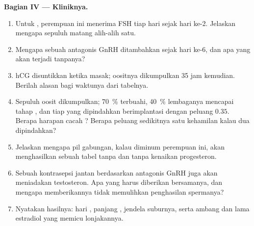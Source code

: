 \begin{problem}
\medskip
\noindent\textbf{Bagian IV --- Kliniknya.}
\begin{enumerate}[resume]
  \item Untuk , perempuan ini menerima FSH tiap
        hari sejak hari ke-2. Jelaskan mengapa sepuluh  matang
        alih-alih satu.
  \item Mengapa sebuah antagonis GnRH ditambahkan sejak hari ke-6, dan
        apa yang akan terjadi tanpanya?
  \item hCG disuntikkan ketika  masak; oositnya dikumpulkan
        35 jam kemudian. Berilah alasan bagi waktunya dari tabelnya.
  \item Sepuluh oosit dikumpulkan; \qty{70}{\%} terbuahi,
        \qty{40}{\%} lembaganya mencapai tahap , dan tiap
         yang dipindahkan berimplantasi dengan peluang
        $0.35$. Berapa harapan cacah ? Berapa peluang
        sedikitnya satu kehamilan kalau dua dipindahkan?
  \item Jelaskan mengapa pil gabungan, kalau diminum perempuan ini,
        akan menghasilkan sebuah tabel tanpa  dan tanpa
        kenaikan progesteron.
  \item Sebuah kontrasepsi jantan berdasarkan antagonis GnRH juga akan
        meniadakan testosteron. Apa yang harus diberikan bersamanya,
        dan mengapa memberikannya tidak memulihkan penghasilan
        spermanya?
  \item Nyatakan hasilnya: hari , panjang ,
        jendela suburnya, serta ambang dan lama estradiol yang memicu
        lonjakannya.
\end{enumerate}
\end{problem}
